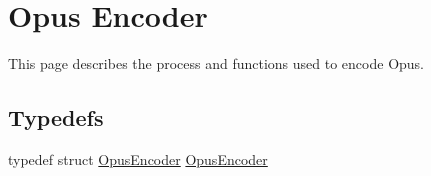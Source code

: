 \hypertarget{group__opus__encoder}{}\section{Opus Encoder}
\label{group__opus__encoder}


This page describes the process and functions used to encode Opus.  


\subsection*{Typedefs}
\begin{DoxyCompactItemize}
\item 
typedef struct \hyperlink{group__opus__encoder_gaf461a3ef2f10c2fe8b994a176f06c9bd}{Opus\+Encoder} \hyperlink{group__opus__encoder_gaf461a3ef2f10c2fe8b994a176f06c9bd}{Opus\+Encoder}
\end{DoxyCompactItemize}
